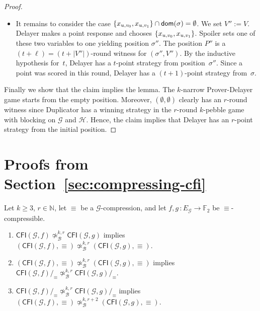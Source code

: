 \documentclass[a4paper,english, thm-restate]{lipics-v2021}
\DeclarePairedDelimiter\set{\lbrace}{\rbrace}
\newcommand{\comp}{\equiv}
\newcommand{\CFIsym}{\mathsf{CFI}}
\newcommand{\CFI}[1]{\CFIsym(#1)}
\newcommand{\compCFI}[2]{\CFI{#1}/_{#2}}
\newcommand{\precompCFI}[2]{{(\CFI{#1},#2)}}
\newcommand{\nat}{\mathbb{N}}
\newcommand{\FF}{\mathbb{F}}
\newcommand{\graphG}{\mathcal{G}}
\newcommand{\graphH}{\mathcal{H}}
\newcommand{\edgeG}{E_{\graphG}}
\newcommand{\dom}{\mathsf{dom}}
\newcommand{\notkbequivr}[2]{\not\simeq_{\mathcal{B}}^{#1,#2}}
\begin{document}
\begin{proof}
\begin{claimproof}
\begin{itemize}
        Hence, we may assume that this case does not occur.
        \item It remains to consider the case $\set{x_{u,v_0}, x_{u,v_1}} \cap \dom(\sigma) = \emptyset$.
        We set $V'' := V$.
        Delayer makes a point response and chooses $\set{x_{u,v_0}, x_{u,v_1}}$.
        Spoiler sets one of these two variables to one yielding position $\sigma''$.
        The position $P''$ is a $(t+\ell)=(t+|V''|)$-round witness for $(\sigma'',V'')$.
        By the inductive hypothesis for~$t$,
        Delayer has a $t$\nobreakdash-point strategy from position~$\sigma''$.
        Since a point was scored in this round,
        Delayer has a $(t+1)$\nobreakdash-point strategy from~$\sigma$. 
    	\claimqedhere
\end{itemize}
\end{claimproof}


Finally we show that the claim implies the lemma. The $k$-narrow Prover-Delayer game starts from the empty position. Moreover, $(\emptyset,\emptyset)$ clearly has an $r$-round witness since Duplicator has a winning strategy in the $r$-round $k$-pebble game with blocking on $\graphG$ and $\graphH$. Hence, the claim implies that Delayer has an $r$-point strategy from the initial position.
\end{proof} 
\section{Proofs from Section~\ref{sec:compressing-cfi}} \label{a: compress}

\begin{lemma}
        Let $k\geq 3$, $r\in\nat$, let $\comp$ be a $\graphG$-compression, and
        let $f,g \, \colon \edgeG \to \FF_2$ be $\comp$\nobreakdash-compressible.
        \begin{enumerate}
                \item $\CFI{\graphG,f} \notkbequivr{k}{r} \CFI{\graphG,g}$
                implies $\precompCFI{\graphG,f}{\comp} \notkbequivr{k}{r} \precompCFI{\graphG,g}{\comp}$.
                \item  $\precompCFI{\graphG,f}{\comp} \notkbequivr{k}{r} \precompCFI{\graphG,g}{\comp}$
                implies $\compCFI{\graphG,f}{\comp} \notkbequivr{k}{r} \compCFI{\graphG,g}{\comp}$.
                \item $\compCFI{\graphG,f}{\comp} \notkbequivr{k}{r} \compCFI{\graphG,g}{\comp}$ implies
                $\precompCFI{\graphG,f}{\comp} \notkbequivr{k}{r+2} \precompCFI{\graphG,g}{\comp}$.
        \end{enumerate}
\end{lemma}
\end{document}
